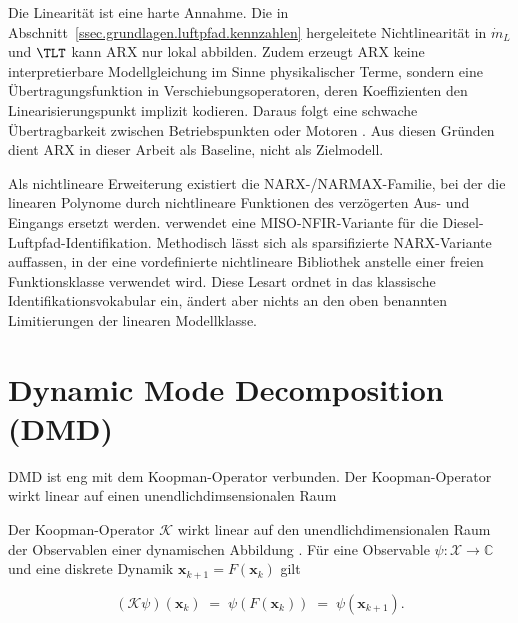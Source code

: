Die Linearität ist eine harte Annahme. Die in
Abschnitt~\ref{ssec.grundlagen.luftpfad.kennzahlen} hergeleitete
Nichtlinearität in $\dot m_L$ und $\TLT$ kann ARX nur lokal abbilden.
Zudem erzeugt ARX keine interpretierbare Modellgleichung im Sinne
physikalischer Terme, sondern eine Übertragungsfunktion in
Verschiebungsoperatoren, deren Koeffizienten den Linearisierungspunkt
implizit kodieren. Daraus folgt eine schwache Übertragbarkeit zwischen
Betriebspunkten oder Motoren \cite{atamAdvancedAirPath2018}. Aus diesen
Gründen dient ARX in dieser Arbeit als Baseline, nicht als Zielmodell.

Als nichtlineare Erweiterung existiert die NARX-/NARMAX-Familie, bei der
die linearen Polynome durch nichtlineare Funktionen des verzögerten
Aus- und Eingangs ersetzt werden. \cite{aranDieselEngineAirpath2020}
verwendet eine MISO-NFIR-Variante für die Diesel-Luftpfad-Identifikation.
Methodisch lässt sich \sindy{} als sparsifizierte NARX-Variante
auffassen, in der eine vordefinierte nichtlineare Bibliothek anstelle
einer freien Funktionsklasse verwendet wird. Diese Lesart ordnet
\sindy{} in das klassische Identifikationsvokabular ein, ändert aber
nichts an den oben benannten Limitierungen der linearen Modellklasse.




\section{Dynamic Mode Decomposition (DMD)}
\label{sec.sot.edmd}

DMD ist eng mit dem Koopman-Operator verbunden. Der Koopman-Operator wirkt linear auf einen unendlichdimsensionalen Raum

Der Koopman-Operator $\mathcal K$ wirkt linear auf den
unendlichdimensionalen Raum der Observablen einer dynamischen Abbildung
\cite{mezicSpectralPropertiesDynamical2005}. Für eine Observable
$\psi: \mathcal X \to \mathbb C$ und eine diskrete Dynamik
$\mathbf x_{k+1} = F(\mathbf x_k)$ gilt

\begin{equation}
  \label{eq.koopman}
  (\mathcal K \psi)(\mathbf x_k) \;=\; \psi(F(\mathbf x_k)) \;=\; \psi(\mathbf x_{k+1}).
\end{equation}

